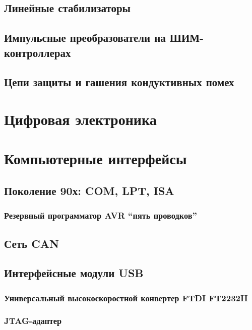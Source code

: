 \section{Линейные стабилизаторы}

\section{Импульсные преобразователи на ШИМ-контроллерах} 

\section{Цепи защиты и гашения кондуктивных помех}

\chapter{Цифровая электроника}

\chapter{Компьютерные интерфейсы}

\section{Поколение 90х: COM, LPT, ISA}

\subsection{Резервный программатор AVR ``пять проводков''}

\section{Сеть CAN}

\section{Интерфейсные модули USB}

\subsection{Универсальный высокоскоростной конвертер FTDI FT2232H}

\subsection{JTAG-адаптер}

